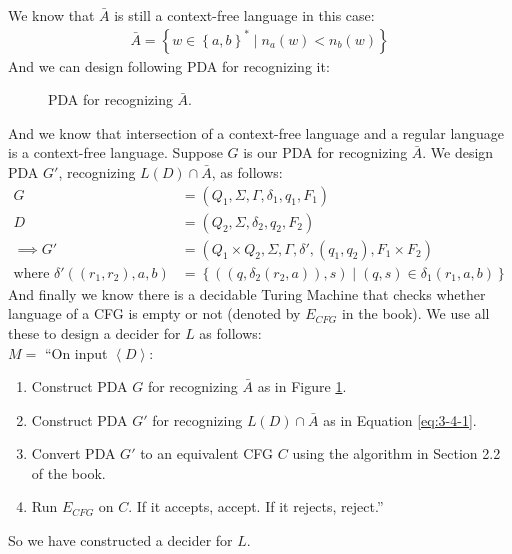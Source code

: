 \documentclass{article}
\begin{document}
We know that \(\bar{A}\) is still a context-free language in this case:
\begin{align*}
\bar{A} = \left\{w\in \left\{a, b\right\}^*\mid n_a(w) < n_b(w)\right\}
\end{align*}
And we can design following PDA for recognizing it:
\begin{figure}[H]
\centering

\caption{PDA for recognizing \(\bar{A}\).}
\label{fig:3-4-1}
\end{figure}
And we know that intersection of a context-free language and a regular language is a context-free language.
Suppose \(G\) is our PDA for recognizing \(\bar{A}\).
We design PDA \(G'\), recognizing \(L(D)\cap \bar{A}\), as follows:
\begin{equation}
\begin{aligned}
G &= \left(Q_1, \Sigma, \Gamma, \delta_1, q_1, F_1\right)\\
D &= \left(Q_2, \Sigma, \delta_2, q_2, F_2\right)\\
\implies G' &= \left(Q_1 \times Q_2, \Sigma, \Gamma, \delta', (q_1, q_2), F_1 \times F_2\right)\\
\text{where } \delta'((r_1, r_2), a, b) &= \left\{((q, \delta_2(r_2, a)), s) \mid (q, s) \in \delta_1(r_1, a, b)\right\}
\end{aligned}
\label{eq:3-4-1}
\end{equation}
And finally we know there is a decidable Turing Machine that checks whether language of a CFG is empty or not (denoted by \(E_{CFG}\) in the book).
We use all these to design a decider for \(L\) as follows:\\[7pt]
\(M = \) ``On input \(\left\langle D\right\rangle\):
\begin{enumerate}
\item Construct PDA \(G\) for recognizing \(\bar{A}\) as in Figure \ref{fig:3-4-1}.
\item Construct PDA \(G'\) for recognizing \(L(D)\cap \bar{A}\) as in Equation \eqref{eq:3-4-1}.
\item Convert PDA \(G'\) to an equivalent CFG \(C\) using the algorithm in Section 2.2 of the book.
\item Run \(E_{CFG}\) on \(C\). If it accepts, accept. If it rejects, reject.''
\end{enumerate}

So we have constructed a decider for \(L\).
\end{document}
